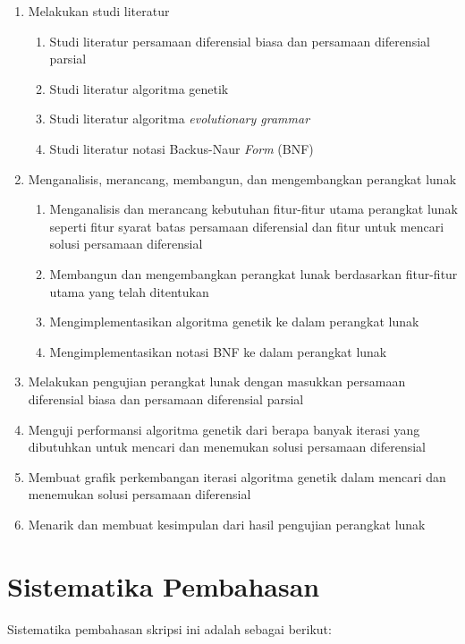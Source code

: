 \begin{enumerate}
	\item Melakukan studi literatur
		\begin{enumerate}
			\item Studi literatur persamaan diferensial biasa dan persamaan diferensial parsial
			\item Studi literatur algoritma genetik
			\item Studi literatur algoritma \textit{evolutionary grammar}
			\item Studi literatur notasi Backus-Naur \textit{Form} (BNF)
		\end{enumerate}
	\item Menganalisis, merancang, membangun, dan mengembangkan perangkat lunak
		\begin{enumerate}
			\item Menganalisis dan merancang kebutuhan fitur-fitur utama perangkat lunak seperti fitur syarat batas persamaan diferensial dan fitur untuk mencari solusi persamaan diferensial
			\item Membangun dan mengembangkan perangkat lunak berdasarkan fitur-fitur utama yang telah ditentukan
			\item Mengimplementasikan algoritma genetik ke dalam perangkat lunak
			\item Mengimplementasikan notasi BNF ke dalam perangkat lunak
		\end{enumerate}
	\item Melakukan pengujian perangkat lunak dengan masukkan persamaan diferensial biasa dan persamaan diferensial parsial
			\item Menguji performansi algoritma genetik dari berapa banyak iterasi yang dibutuhkan untuk mencari dan menemukan solusi persamaan diferensial
			\item Membuat grafik perkembangan iterasi algoritma genetik dalam mencari dan menemukan solusi persamaan diferensial
	\item Menarik dan membuat kesimpulan dari hasil pengujian perangkat lunak
\end{enumerate}

\section{Sistematika Pembahasan}
\label{sec:sispem}

Sistematika pembahasan skripsi ini adalah sebagai berikut:

